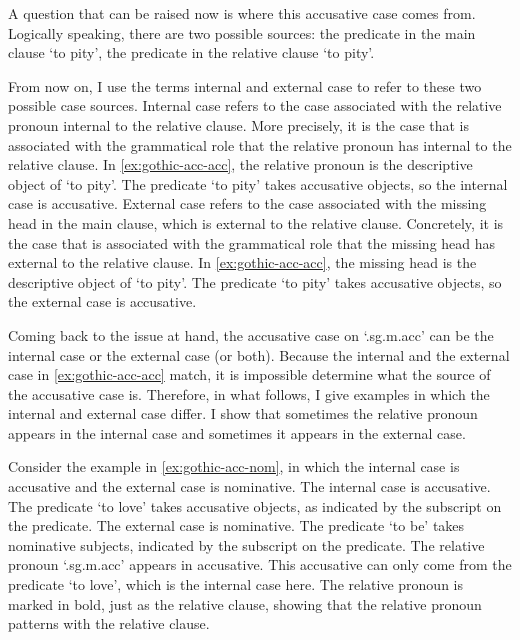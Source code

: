 A question that can be raised now is where this accusative case comes from. Logically speaking, there are two possible sources: the predicate in the main clause  `to pity', the predicate in the relative clause  `to pity'.

From now on, I use the terms internal and external case to refer to these two possible case sources.
Internal case refers to the case associated with the relative pronoun internal to the relative clause. More precisely, it is the case that is associated with the grammatical role that the relative pronoun has internal to the relative clause. In \ref{ex:gothic-acc-acc}, the relative pronoun is the descriptive object of  `to pity'. The predicate  `to pity' takes accusative objects, so the internal case is accusative.
External case refers to the case associated with the missing head in the main clause, which is external to the relative clause. Concretely, it is the case that is associated with the grammatical role that the missing head has external to the relative clause. In \ref{ex:gothic-acc-acc}, the missing head is the descriptive object of  `to pity'. The predicate  `to pity' takes accusative objects, so the external case is accusative.

Coming back to the issue at hand, the accusative case on  `.\ac{sg}.\ac{m}.\ac{acc}' can be the internal case or the external case (or both).
Because the internal and the external case in \ref{ex:gothic-acc-acc} match, it is impossible determine what the source of the accusative case is.
Therefore, in what follows, I give examples in which the internal and external case differ.
I show that sometimes the relative pronoun appears in the internal case and sometimes it appears in the external case.

Consider the example in \ref{ex:gothic-acc-nom}, in which the internal case is accusative and the external case is nominative.
The internal case is accusative. The predicate  `to love' takes accusative objects, as indicated by the subscript on the predicate.
The external case is nominative. The predicate  `to be' takes nominative subjects, indicated by the subscript on the predicate.
The relative pronoun  `.\ac{sg}.\ac{m}.\ac{acc}' appears in accusative. This accusative can only come from the predicate  `to love', which is the internal case here. The relative pronoun is marked in bold, just as the relative clause, showing that the relative pronoun patterns with the relative clause.

